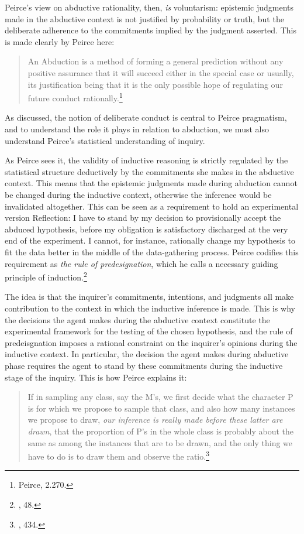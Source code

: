 Peirce's view on abductive rationality, then, \emph{is} voluntarism:
epistemic judgments made in the abductive context is not justified by
probability or truth, but the deliberate adherence to the commitments
implied by the judgment asserted. This is made clearly by Peirce here:

\begin{quote}
An Abduction is a method of forming a general prediction without any
positive assurance that it will succeed either in the special case or
usually, its justification being that it is the only possible hope of
regulating our future conduct rationally.\footnote{Peirce, 2.270.}
\end{quote}

As discussed, the notion of deliberate conduct is central to Peirce
pragmatism, and to understand the role it plays in relation to
abduction, we must also understand Peirce's statistical understanding of
inquiry.

As Peirce sees it, the validity of inductive reasoning is strictly
regulated by the statistical structure deductively by the commitments
she makes in the abductive context. This means that the epistemic
judgments made during abduction cannot be changed during the inductive
context, otherwise the inference would be invalidated altogether. This
can be seen as a requirement to hold an experimental version Reflection:
I have to stand by my decision to provisionally accept the abduced
hypothesis, before my obligation is satisfactory discharged at the very
end of the experiment. I cannot, for instance, rationally change my
hypothesis to fit the data better in the middle of the data-gathering
process. Peirce codifies this requirement as \emph{the rule of
predesignation}, which he calls a necessary guiding principle of
induction.\footnote{\cite{essentialpeirce2}, 48.}

The idea is that the inquirer's commitments, intentions, and judgments
all make contribution to the context in which the inductive inference is
made. This is why the decisions the agent makes during the abductive
context constitute the experimental framework for the testing of the
chosen hypothesis, and the rule of predeisgnation imposes a rational
constraint on the inquirer's opinions during the inductive context. In
particular, the decision the agent makes during abductive phase requires
the agent to stand by these commitments during the inductive stage of
the inquiry. This is how Peirce explains it:

\begin{quote}
If in sampling any class, say the M's, we first decide what the
character P is for which we propose to sample that class, and also how
many instances we propose to draw, \emph{our inference is really made
before these latter are drawn}, that the proportion of P's in the whole
class is probably about the same as among the instances that are to be
drawn, and the only thing we have to do is to draw them and observe the
ratio.\footnote{\cite{probableinference}, 434.}
\end{quote}

